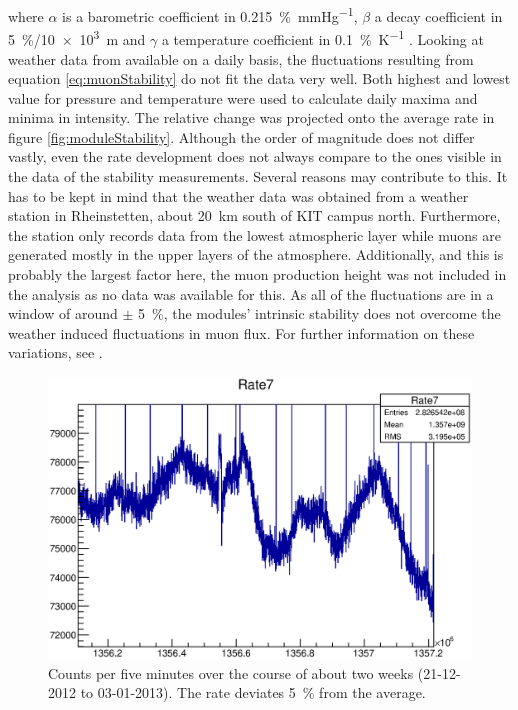   where $\alpha$ is a barometric coefficient in \SI{0.215}{\percent\per\mmHg}, $\beta$ a decay coefficient in \SI{5}{\percent}/\SI{10e3}{\meter} and $\gamma$ a temperature coefficient in \SI{0.1}{\percent\per\kelvin} \cite{muonIntensity}.
  Looking at weather data from \cite{wetterCom} available on a daily basis, the fluctuations resulting from equation \ref{eq:muonStability} do not fit the data very well. Both highest and lowest value for pressure and temperature were used to calculate daily maxima and minima in intensity. The relative change was projected onto the average rate in figure \ref{fig:moduleStability}. Although the order of magnitude does not differ vastly, even the rate development does not always compare to the ones visible in the data of the stability measurements. Several reasons may contribute to this. It has to be kept in mind that the weather data was obtained from a weather station in Rheinstetten, about \SI{20}{\kilo\meter} south of KIT campus north. Furthermore, the station only records data from the lowest atmospheric layer while muons are generated mostly in the upper layers of the atmosphere. Additionally, and this is probably the largest factor here, the muon production height was not included in the analysis as no data was available for this. As all of the fluctuations are in a window of around $\pm$ \SI{5}{\percent}, the modules' intrinsic stability does not overcome the weather induced fluctuations in muon flux. For further information on these variations, see \cite{fluxVariation}.
  \begin{figure}
  \centering
	\includegraphics[width = 0.9 \textwidth]{graphics/setup/stability.eps}
  	\caption[Muon Module Stability]{Counts per five minutes over the course of about two weeks (21-12-2012 to 03-01-2013). The rate deviates \SI{5}{\percent} from the average.}
  \end{figure}

